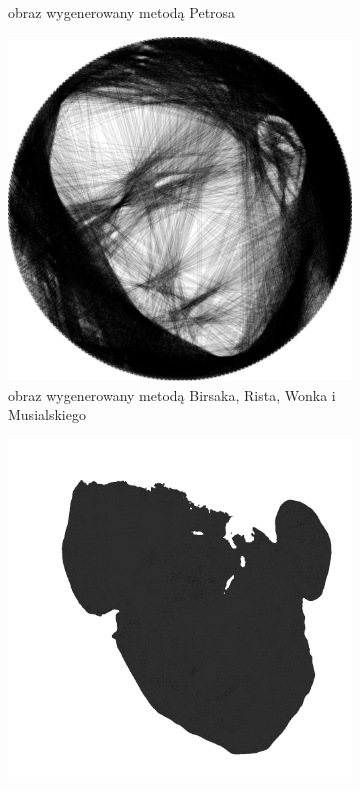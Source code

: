\begin{figure}[H]
\begin{subfigure}{0.31\textwidth}
            \caption{obraz wygenerowany metodą Petrosa\\\hphantom{ }}
            \label{comp-comp-magdalene-b}
        \end{subfigure}
        \begin{subfigure}{0.31\textwidth}
            \centering
            \includegraphics[width = \textwidth]{img/6-comp/magdalene_birsak_.png}
            \caption{obraz wygenerowany metodą Birsaka, Rista, Wonka i Musialskiego}
            \label{comp-comp-magdalene-c}
        \end{subfigure}
        \begin{subfigure}{0.23\textwidth}
            \centering
            \includegraphics[width = \textwidth]{img/6-comp/magdalene_mask_c20_inv0_bg1_obj10_ed1.png}

\end{subfigure}
\end{figure}
